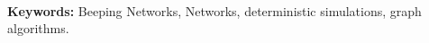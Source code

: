 \

\noindent
{\bf Keywords:} Beeping Networks, \congest Networks, deterministic simulations, 
graph algorithms.



